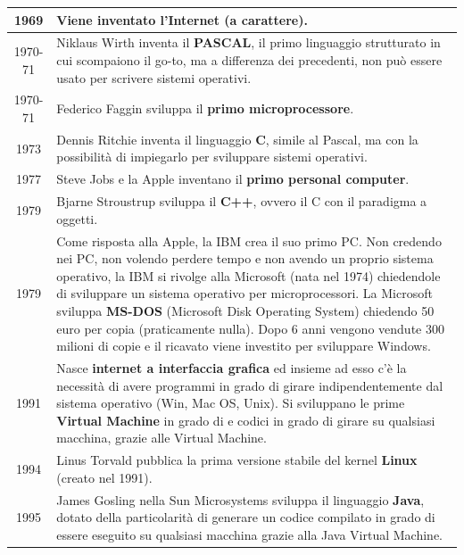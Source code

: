\documentclass[a4paper]{article}
\begin{document}
\begin{center}
\begin{tabularx}{\textwidth}{c X}
		1969
		& Viene inventato l'\textbf{Internet} (a carattere). \\
		\midrule

		1970-71
		& Niklaus Wirth inventa il \textbf{PASCAL}, il primo linguaggio strutturato in cui scompaiono il go-to, ma a
		differenza dei precedenti, non può essere usato per scrivere sistemi operativi. \\
		\midrule

		1970-71
		& Federico Faggin sviluppa il \textbf{primo microprocessore}. \\
		\midrule
		
		1973
		& Dennis Ritchie inventa il linguaggio \textbf{C}, simile al Pascal, ma con la possibilità di impiegarlo per
		sviluppare sistemi operativi. \\
		\midrule

		1977
		& Steve Jobs e la Apple inventano il \textbf{primo personal computer}. \\
		\midrule
		
		1979
		& Bjarne Stroustrup sviluppa il \textbf{C++}, ovvero il C con il paradigma a oggetti. \\
		\midrule
		
		1979
		& Come risposta alla Apple, la IBM crea il suo primo PC. Non credendo nei PC, non volendo perdere tempo e non
		avendo un proprio sistema operativo, la IBM si rivolge alla Microsoft (nata nel 1974) chiedendole di sviluppare
		un sistema operativo per microprocessori. La Microsoft sviluppa \textbf{MS-DOS} (Microsoft Disk Operating System)
		chiedendo 50 euro per copia (praticamente nulla). Dopo 6 anni vengono vendute 300 milioni di copie e il ricavato
		viene investito per sviluppare Windows. \\
		\midrule

		1991
		& Nasce \textbf{internet a interfaccia grafica} ed insieme ad esso c'è la necessità di avere programmi in grado di girare
		indipendentemente dal sistema operativo (Win, Mac OS, Unix). Si sviluppano le prime \textbf{Virtual Machine} in grado di 
		e codici in grado di girare su qualsiasi macchina, grazie alle Virtual Machine. \\
		\midrule
		
		1994
		& Linus Torvald pubblica la prima versione stabile del kernel \textbf{Linux} (creato nel 1991). \\
		\midrule
		
		1995
		& James Gosling nella Sun Microsystems sviluppa il linguaggio \textbf{Java}, dotato della particolarità di generare un codice
		compilato in grado di essere eseguito su qualsiasi macchina grazie alla Java Virtual Machine.
	\end{tabularx}
\end{center}
\end{document}
